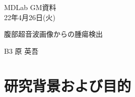 \documentclass[a4j]{ujarticle}
\begin{document}
    \begin{flushright}
        MDLab GM資料\\
        22年4月26日(火)
    \end{flushright}

    \begin{center}
        {\Large	腹部超音波画像からの腫瘍検出}
    \end{center}

    \begin{flushright}
        {\large B3  原 英吾}\\
    \end{flushright}

    \section{研究背景および目的}
\end{document}
